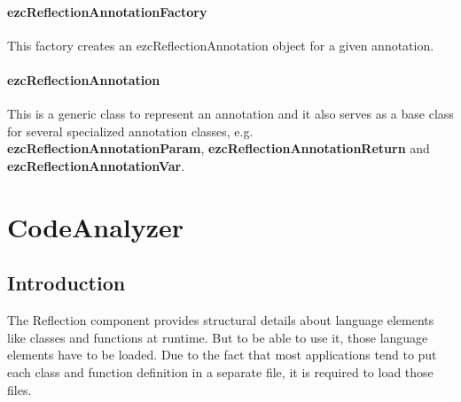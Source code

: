 \documentclass[10pt,final,a4paper,oneside]{article}
\begin{document}
\paragraph{ezcReflectionAnnotationFactory}
This factory creates an ezcReflectionAnnotation
object for a given annotation.

\paragraph{ezcReflectionAnnotation}
This is a generic class to represent an annotation
and it also serves as a base class for several
specialized annotation classes, e.g.
\textbf{ezcReflectionAnnotationParam},
\textbf{ezcReflectionAnnotationReturn} and
\textbf{ezcReflectionAnnotationVar}.










\section{CodeAnalyzer}\label{sec:CodeAnalyzer}
%
\subsection{Introduction}
The Reflection component provides structural details about
language elements like classes and functions at runtime.
But to be able to use it, those language elements have to be loaded.
Due to the fact that most applications tend to put each class
and function definition in a separate file, it is required to load those files.
\end{document}
